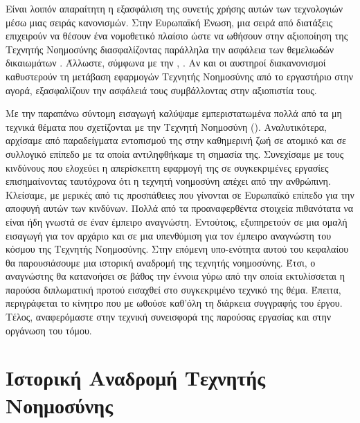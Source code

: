 Είναι λοιπόν απαραίτητη η εξασφάλιση της συνετής χρήσης αυτών των τεχνολογιών μέσω μιας σειράς κανονισμών. Στην Ευρωπαϊκή Ένωση, μια σειρά από διατάξεις επιχειρούν να θέσουν ένα νομοθετικό πλαίσιο ώστε να ωθήσουν στην αξιοποίηση της Τεχνητής Νοημοσύνης διασφαλίζοντας παράλληλα την ασφάλεια των θεμελιωδών δικαιωμάτων \cite{europeancomissionai2021}. Άλλωστε, σύμφωνα με την  \cite{VonderLeyen2019}, . Αν και οι αυστηροί διακανονισμοί καθυστερούν τη μετάβαση εφαρμογών Τεχνητής Νοημοσύνης από το εργαστήριο στην αγορά, εξασφαλίζουν την ασφάλειά τους συμβάλλοντας στην αξιοπιστία τους.
\par

Με την παραπάνω σύντομη εισαγωγή καλύψαμε εμπεριστατωμένα πολλά από τα μη τεχνικά θέματα που σχετίζονται με την Τεχνητή Νοημοσύνη ().
Αναλυτικότερα, αρχίσαμε από παραδείγματα εντοπισμού της στην καθημερινή ζωή σε ατομικό και σε συλλογικό επίπεδο με τα οποία αντιληφθήκαμε τη σημασία της. Συνεχίσαμε με τους κινδύνους που ελοχεύει η απερίσκεπτη εφαρμογή της σε συγκεκριμένες εργασίες επισημαίνοντας ταυτόχρονα ότι η τεχνητή νοημοσύνη απέχει από την ανθρώπινη. Κλείσαμε, με μερικές από τις προσπάθειες που γίνονται σε Ευρωπαϊκό επίπεδο για την αποφυγή αυτών των κινδύνων.
Πολλά από τα προαναφερθέντα στοιχεία πιθανότατα να είναι ήδη γνωστά σε έναν έμπειρο αναγνώστη. Εντούτοις, εξυπηρετούν σε μια ομαλή εισαγωγή για τον αρχάριο και σε μια υπενθύμιση για τον έμπειρο αναγνώστη του κόσμου της Τεχνητής Νοημοσύνης.
Στην επόμενη υπο-ενότητα αυτού του κεφαλαίου θα παρουσιάσουμε μια ιστορική αναδρομή της τεχνητής νοημοσύνης. Έτσι, ο αναγνώστης θα κατανοήσει σε βάθος την έννοια γύρω από την οποία εκτυλίσσεται η παρούσα διπλωματική προτού εισαχθεί στο συγκεκριμένο τεχνικό της θέμα. Έπειτα, περιγράφεται το κίνητρο που με ωθούσε καθ'όλη τη διάρκεια συγγραφής του έργου. Τέλος, αναφερόμαστε στην τεχνική συνεισφορά της παρούσας εργασίας και στην οργάνωση του τόμου.



\section[Ιστορική Αναδρομή Τεχνιτής Νοημοσύνης]{Ιστορική Αναδρομή Τεχνητής Νοημοσύνης}
\label{sec:historic_note}

